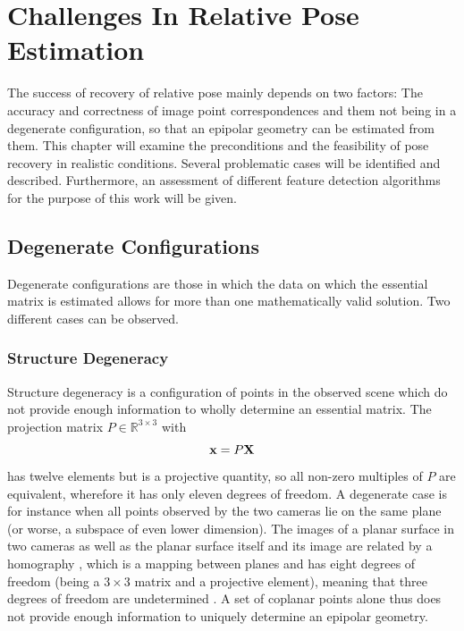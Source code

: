 \chapter{Challenges In Relative Pose Estimation}

The success of recovery of relative pose mainly depends on two factors: The
accuracy and correctness of image point correspondences and them not being in a
degenerate configuration, so that an epipolar geometry can be estimated from
them.  This chapter will examine the preconditions and the feasibility of pose
recovery in realistic conditions. Several problematic cases will be identified
and described. Furthermore, an assessment of different feature detection
algorithms for the purpose of this work will be given.

\section{Degenerate Configurations}

Degenerate configurations are those in which the data on which the essential
matrix is estimated allows for more than one mathematically valid solution. Two
different cases can be observed.

\subsection{Structure Degeneracy}

Structure degeneracy is a configuration of points in the observed scene which do
not provide enough information to wholly determine an essential matrix. The
projection matrix $P\in\mathbb{R}^{3\times3}$ with 
\begin{equation*}
   \mathbf{x} = P\mathbf{X}
\end{equation*}
has twelve elements but is a projective quantity, so all non-zero multiples of
$P$ are equivalent, wherefore it has only eleven degrees of freedom.  A
degenerate case is for instance when all points observed by the two cameras lie
on the same plane (or worse, a subspace of even lower dimension). The images of
a planar surface in two cameras as well as the planar surface itself and its
image are related by a homography \citep[see][ch. 13]{h&z2004}, which is a
mapping between planes and has eight degrees of freedom (being a $3\times3$
matrix and a projective element), meaning that three degrees of freedom are
undetermined \citep{torr1999}. A set of coplanar points alone thus does not provide
enough information to uniquely determine an epipolar geometry.


